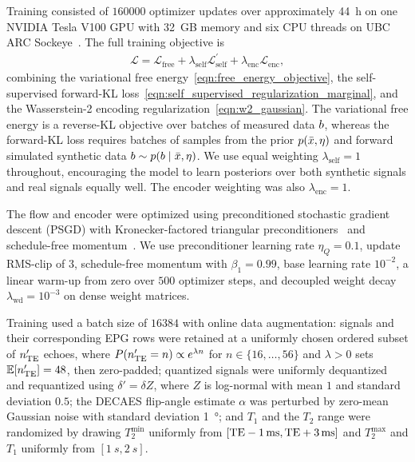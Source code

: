 Training consisted of $\num{160000}$ optimizer updates over approximately \SI{44}{\hour} on one NVIDIA Tesla V100 \gls*{GPU} with \SI{32}{GB} memory and six CPU threads on UBC ARC Sockeye~\citep{ubc_arc_sockeye}.
The full training objective is
\begin{align}\label{eqn:total_objective}
    \mathcal{L} = \mathcal{L}_{\text{free}} + \lambda_{\text{self}} \mathcal{L}_{\text{self}}^{\prime} + \lambda_{\text{enc}} \mathcal{L}_{\text{enc}},
\end{align}
combining the variational free energy~\eqref{eqn:free_energy_objective}, the self-supervised forward-\gls*{KL} loss~\eqref{eqn:self_supervised_regularization_marginal}, and the Wasserstein-2 encoding regularization~\eqref{eqn:w2_gaussian}.
The variational free energy is a reverse-\gls*{KL} objective over batches of measured data $b$, whereas the forward-\gls*{KL} loss requires batches of samples from the prior $p(\bar{x}, \eta)$ and forward simulated synthetic data $b \sim p(b \mid \bar{x}, \eta)$.
We use equal weighting $\lambda_{\text{self}} = 1$ throughout, encouraging the model to learn posteriors over both synthetic signals and real signals equally well.
The encoder weighting was also $\lambda_{\text{enc}} = 1$.

The flow and encoder were optimized using preconditioned stochastic gradient descent (\textsc{PSGD}) with Kronecker-factored triangular preconditioners~\citep{li_preconditioned_2018,li_stochastic_2025} and schedule-free momentum~\citep{defazio_road_2024,nestler_heavyball_2026}.
We use preconditioner learning rate $\eta_Q = 0.1$, update \gls*{RMS}-clip of $3$, schedule-free momentum with $\beta_1 = 0.99$, base learning rate $10^{-2}$, a linear warm-up from zero over $500$ optimizer steps, and decoupled weight decay $\lambda_{\mathrm{wd}} = 10^{-3}$ on dense weight matrices.

Training used a batch size of $\num{16384}$ with online data augmentation:
signals and their corresponding \gls*{EPG} rows were retained at a uniformly chosen ordered subset of $n'_{\mathrm{TE}}$ echoes, where $P(n'_{\mathrm{TE}}=n)\propto e^{\lambda n}$ for $n\in\{16,\ldots,56\}$ and $\lambda>0$ sets $\mathbb{E}[n'_{\mathrm{TE}}]=48$, then zero-padded;
quantized signals were uniformly dequantized and requantized using $\delta'=\delta Z$, where $Z$ is log-normal with mean $1$ and standard deviation $0.5$;
the \gls*{DECAES} flip-angle estimate $\alpha$ was perturbed by zero-mean Gaussian noise with standard deviation \SI{1}{\degree};
and $T_1$ and the $T_2$ range were randomized by drawing $T_2^{\min}$ uniformly from $[\TE - \SI{1}{\ms}, \TE + \SI{3}{\ms}]$ and $T_2^{\max}$ and $T_1$ uniformly from $[\SI{1}{s}, \SI{2}{s}]$.

